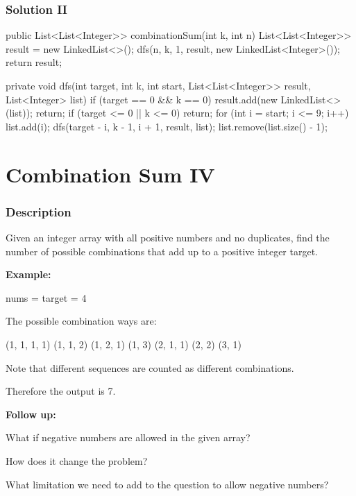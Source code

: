 \newpage

\subsubsection{Solution II}

\begin{Code}
public List<List<Integer>> combinationSum(int k, int n) {
    List<List<Integer>> result = new LinkedList<>();
    dfs(n, k, 1, result, new LinkedList<Integer>());
    return result;
}

private void dfs(int target, int k, int start, List<List<Integer>> result, List<Integer> list) {
    if (target == 0 && k == 0) {
        result.add(new LinkedList<>(list));
        return;
    }
    if (target <= 0 || k <= 0) {
        return;
    }
    for (int i = start; i <= 9; i++) {
        list.add(i);
        dfs(target - i, k - 1, i + 1, result, list);
        list.remove(list.size() - 1);
    }
}
\end{Code}

\newpage

\section{Combination Sum IV} %

\subsubsection{Description}
Given an integer array with all positive numbers and no duplicates, find the number of possible combinations that add up to a positive integer target.

\textbf{Example:}

nums = \code{[1, 2, 3]}
target = 4

The possible combination ways are:
\begin{Code}
(1, 1, 1, 1)
(1, 1, 2)
(1, 2, 1)
(1, 3)
(2, 1, 1)
(2, 2)
(3, 1)
\end{Code}

Note that different sequences are counted as different combinations.

Therefore the output is 7.

\textbf{Follow up:}

What if negative numbers are allowed in the given array?

How does it change the problem?

What limitation we need to add to the question to allow negative numbers?

